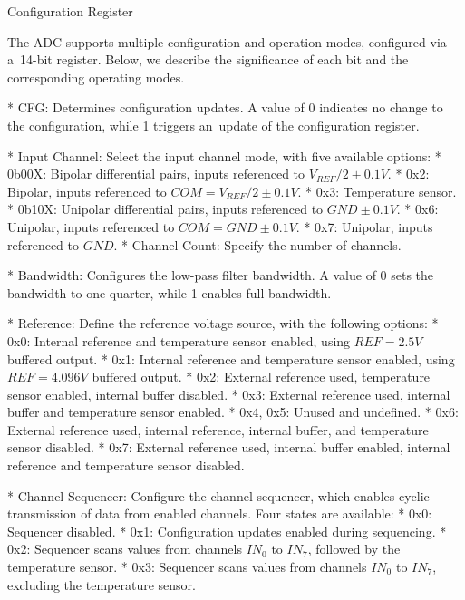 \secc Configuration Register

The ADC supports multiple configuration and operation modes, configured via a~14-bit register. Below, we describe the significance of each bit and the corresponding operating modes.

\begitems
* {\sbf [13] CFG}: Determines configuration updates. A value of 0 indicates no change to the configuration, while 1 triggers an~update of the configuration register.

* {\sbf [12:10] Input Channel}: Select the input channel mode, with five available options:
    \begitems
    * {0b00X}: Bipolar differential pairs, inputs referenced to $V_{REF}/2 \pm 0.1 {V}$.
    * 0x2: Bipolar, inputs referenced to $COM = V_{REF}/2 \pm 0.1 {V}$.
    * 0x3: Temperature sensor.
    * {0b10X}: Unipolar differential pairs, inputs referenced to $GND \pm 0.1 {V}$.
    * 0x6: Unipolar, inputs referenced to $COM = GND \pm 0.1 {V}$.
    * 0x7: Unipolar, inputs referenced to $GND$.
    \enditems
* {\sbf [9:7] Channel Count}: Specify the number of channels.

* {\sbf [6] Bandwidth}: Configures the low-pass filter bandwidth. A value of 0 sets the bandwidth to one-quarter, while 1 enables full bandwidth.

* {\sbf [5:3] Reference}: Define the reference voltage source, with the following options:
    \begitems
    * 0x0: Internal reference and temperature sensor enabled, using $REF = 2.5 {V}$ buffered output.
    * 0x1: Internal reference and temperature sensor enabled, using $REF = 4.096 {V}$ buffered output.
    * 0x2: External reference used, temperature sensor enabled, internal buffer disabled.
    * 0x3: External reference used, internal buffer and temperature sensor enabled.
    * 0x4, 0x5: Unused and undefined.
    * 0x6: External reference used, internal reference, internal buffer, and temperature sensor disabled.
    * 0x7: External reference used, internal buffer enabled, internal reference and temperature sensor disabled.
    \enditems

* {\sbf [2:1] Channel Sequencer}: Configure the channel sequencer, which enables cyclic transmission of data from enabled channels. Four states are available:
    \begitems
    * 0x0: Sequencer disabled.
    * 0x1: Configuration updates enabled during sequencing.
    * 0x2: Sequencer scans values from channels $IN_0$ to $IN_7$, followed by the temperature sensor.
    * 0x3: Sequencer scans values from channels $IN_0$ to $IN_7$, excluding the temperature sensor.
    \enditems


